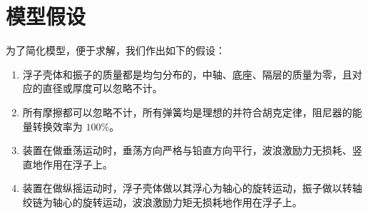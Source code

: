 \section{模型假设}

为了简化模型，便于求解，我们作出如下的假设：

\begin{enumerate}
    \item 浮子壳体和振子的质量都是均匀分布的，中轴、底座、隔层的质量为零，且对应的直径或厚度可以忽略不计。
    \item 所有摩擦都可以忽略不计，所有弹簧均是理想的并符合胡克定律，阻尼器的能量转换效率为 $100\%$。
    \item 装置在做垂荡运动时，垂荡方向严格与铅直方向平行，波浪激励力无损耗、竖直地作用在浮子上。
    \item 装置在做纵摇运动时，浮子壳体做以其浮心为轴心的旋转运动，振子做以转轴绞链为轴心的旋转运动，波浪激励力矩无损耗地作用在浮子上。
\end{enumerate}